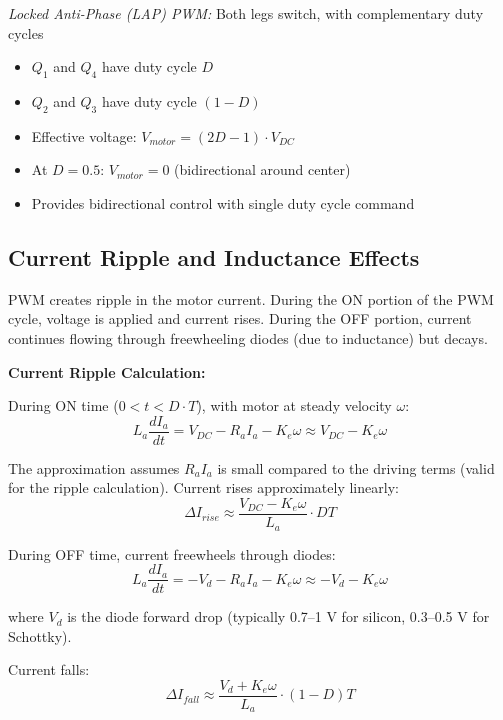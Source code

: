 \textit{Locked Anti-Phase (LAP) PWM:} Both legs switch, with complementary duty cycles
\begin{itemize}
    \item $Q_1$ and $Q_4$ have duty cycle $D$
    \item $Q_2$ and $Q_3$ have duty cycle $(1-D)$
    \item Effective voltage: $V_{motor} = (2D - 1) \cdot V_{DC}$
    \item At $D = 0.5$: $V_{motor} = 0$ (bidirectional around center)
    \item Provides bidirectional control with single duty cycle command
\end{itemize}

\subsection{Current Ripple and Inductance Effects}

PWM creates ripple in the motor current. During the ON portion of the PWM cycle, voltage is applied and current rises. During the OFF portion, current continues flowing through freewheeling diodes (due to inductance) but decays.

\textbf{Current Ripple Calculation:}

During ON time ($0 < t < D \cdot T$), with motor at steady velocity $\omega$:
\begin{equation}
    L_a \frac{dI_a}{dt} = V_{DC} - R_a I_a - K_e \omega \approx V_{DC} - K_e \omega
\end{equation}

The approximation assumes $R_a I_a$ is small compared to the driving terms (valid for the ripple calculation). Current rises approximately linearly:
\begin{equation}
    \Delta I_{rise} \approx \frac{V_{DC} - K_e \omega}{L_a} \cdot D T
\end{equation}

During OFF time, current freewheels through diodes:
\begin{equation}
    L_a \frac{dI_a}{dt} = -V_d - R_a I_a - K_e \omega \approx -V_d - K_e \omega
\end{equation}

where $V_d$ is the diode forward drop (typically 0.7--1 V for silicon, 0.3--0.5 V for Schottky).

Current falls:
\begin{equation}
    \Delta I_{fall} \approx \frac{V_d + K_e \omega}{L_a} \cdot (1-D) T
\end{equation}

